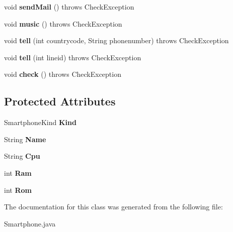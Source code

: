 \begin{DoxyCompactItemize}
\mbox{\label{classswimmypractice5_1_1_smartphone_a8b6d550030d179ee09856ccac44ee348}} 
void {\bfseries send\+Mail} ()  throws Check\+Exception
\item 
\mbox{\label{classswimmypractice5_1_1_smartphone_a6132726ae6e1d135a784fa59a27575b9}} 
void {\bfseries music} ()  throws Check\+Exception  
\item 
\mbox{\label{classswimmypractice5_1_1_smartphone_aa41ab0fe3d572d360d2d7068233aba91}} 
void {\bfseries tell} (int countrycode, String phonenumber)  throws Check\+Exception
\item 
\mbox{\label{classswimmypractice5_1_1_smartphone_a80425c13cea1cb2b7ec50cb2e599759d}} 
void {\bfseries tell} (int lineid)  throws Check\+Exception
\item 
\mbox{\label{classswimmypractice5_1_1_smartphone_add498943a7c49d5caa8b0fee4e4e523b}} 
void {\bfseries check} ()  throws Check\+Exception
\end{DoxyCompactItemize}
\subsection*{Protected Attributes}
\begin{DoxyCompactItemize}
\item 
\mbox{\label{classswimmypractice5_1_1_smartphone_aad0c3687814a221a2d1db8b8668416f5}} 
Smartphone\+Kind {\bfseries Kind}
\item 
\mbox{\label{classswimmypractice5_1_1_smartphone_a429a919aebb3a8a1495f2fbe0a7f0ad9}} 
String {\bfseries Name}
\item 
\mbox{\label{classswimmypractice5_1_1_smartphone_ac6b3d91ad8c976fa50ced5075b65a915}} 
String {\bfseries Cpu}
\item 
\mbox{\label{classswimmypractice5_1_1_smartphone_ab5d518cc00d902934360b8c902e894df}} 
int {\bfseries Ram}
\item 
\mbox{\label{classswimmypractice5_1_1_smartphone_a6afd722dff66d4649fdafb03ec9eb660}} 
int {\bfseries Rom}
\end{DoxyCompactItemize}


The documentation for this class was generated from the following file\+:\begin{DoxyCompactItemize}
\item 
Smartphone.\+java\end{DoxyCompactItemize}

